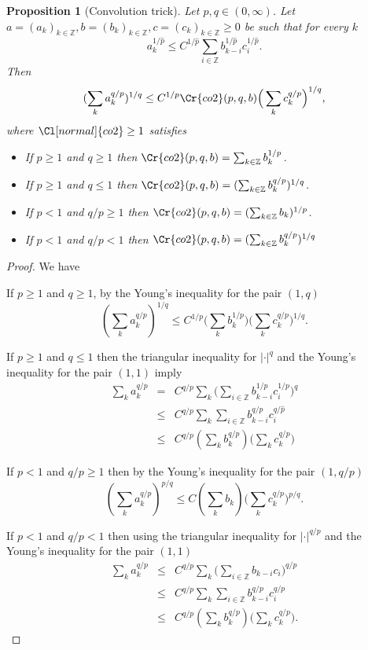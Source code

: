 \documentclass{amsart}
\newtheorem{proposition}[theorem]{Proposition}
\theoremstyle{definition}
\newcommand{\Cll}[2][normal]{\Cl[#1]{#2}}
\newcommand{\Crr}[1]{\Cr{#1}}
\begin{document}
\begin{proposition}[Convolution  trick]\label{young} Let $p,q\in (0, \infty)$. Let $a=(a_k)_{k\in \mathbb{Z}}, b=(b_k)_{k\in \mathbb{Z}},c=(c_k)_{k\in \mathbb{Z}}\geq 0$ be such that for every $k$
$$a_k^{1/\hat{p}} \leq C^{1/\hat{p}} \sum_{i\in \mathbb{Z}} b_{k-i}^{1/\hat{p}}c_i^{1/\hat{p}}.$$
Then
$$(\sum_k a_k^{q/p})^{1/q} \leq  C^{1/p}    \Crr{co2}(p,q,b) \Big(  \sum_k c_k^{q/p}\Big)^{1/q},$$
where $\Cll{co2}\geq 1$ satisfies 
\begin{itemize} 
\item[A.] If $p\geq 1$ and $q\geq 1$ then $\Crr{co2}(p,q,b)= \sum_{k\in \mathbb{Z}} b_k^{1/p}$. 
\item[B.] If $p\geq 1$ and $q\leq  1$ then $\Crr{co2}(p,q,b)=(\sum_{k\in \mathbb{Z}} b_k^{q/p})^{1/q}$.
\item[C.] If $p< 1$ and $q/p\geq 1$ then $\Crr{co2}(p,q,b)=(\sum_{k\in \mathbb{Z}} b_k)^{1/p}$.
\item[D.] If $p< 1$ and $q/p<   1$ then $\Crr{co2}(p,q,b)=(\sum_{k\in \mathbb{Z}} b_k^{q/p})^{1/q}$
\end{itemize}

\end{proposition}  
\begin{proof} We have


  If $p\geq 1$ and $q\geq 1$, by the Young's inequality for the pair $(1,q)$ 
$$(\sum_k a_k^{q/p})^{1/q} \leq  C^{1/p}    \big( \sum_k b_k^{1/p}\big) \Big(  \sum_k c_k^{q/p}\Big)^{1/q}.$$

 If $p\geq 1$ and $q\leq 1$ then   the triangular inequality for $|\cdot|^q$ and the Young's inequality for the pair $(1,1)$ imply 
\begin{eqnarray*}
\sum_{k} a_k^{q/p}&=& C^{q/p} \sum_k \big(  \sum_{i\in \mathbb{Z}} b_{k-i}^{1/p}c_i^{1/p} \big)^q \\
&\leq&C^{q/p}   \sum_k \sum_{i\in \mathbb{Z}} b_{k-i}^{q/p}c_i^{q/\hat{p}}  \\
&\leq& C^{q/p}   (\sum_k b_k^{q/p})\Big( \sum_k c_k^{q/p}\Big)
\end{eqnarray*}

 If $p< 1$ and $q/p \geq 1$ then by the  Young's  inequality for the pair $(1, q/p)$
$$(\sum_{k} a_k^{q/p})^{p/q} \leq C (\sum_k b_k)    \big(  \sum_k c_k^{q/p}\big)^{p/q}.$$

 If $p<  1$ and $q/p<  1$ then  using the triangular inequality for $|\cdot|^{q/p}$ and the Young's inequality for the pair $(1,1)$ 
\begin{eqnarray*} \sum_k a_k^{q/p}&\leq& C^{q/p} \sum_k \big(\sum_{i\in \mathbb{Z}}  b_{k-i} c_i\big)^{q/p}\\
&\leq& C^{q/p} \sum_k  \sum_{i\in \mathbb{Z}} b_{k-i}^{q/p}  c_i^{q/p}\\
&\leq& C^{q/p} (\sum_k b_k^{q/p}) \Big(  \sum_k c_k^{q/p}\Big).
\end{eqnarray*} 
\end{proof}
\end{document}
